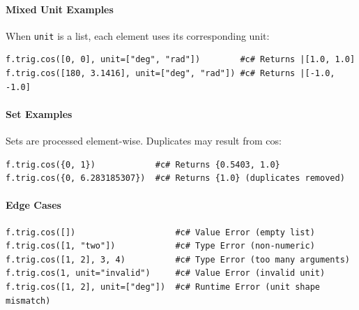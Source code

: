 \paragraph{Mixed Unit Examples}
When \texttt{unit} is a list, each element uses its corresponding unit:
\begin{verbatim}
f.trig.cos([0, 0], unit=["deg", "rad"])        #c# Returns |[1.0, 1.0]
f.trig.cos([180, 3.1416], unit=["deg", "rad"]) #c# Returns |[-1.0, -1.0]
\end{verbatim}

\paragraph{Set Examples}
Sets are processed element-wise. Duplicates may result from cos:
\begin{verbatim}
f.trig.cos({0, 1})            #c# Returns {0.5403, 1.0}
f.trig.cos({0, 6.283185307})  #c# Returns {1.0} (duplicates removed)
\end{verbatim}

\paragraph{Edge Cases}
\begin{verbatim}
f.trig.cos([])                    #c# Value Error (empty list)
f.trig.cos([1, "two"])            #c# Type Error (non-numeric)
f.trig.cos([1, 2], 3, 4)          #c# Type Error (too many arguments)
f.trig.cos(1, unit="invalid")     #c# Value Error (invalid unit)
f.trig.cos([1, 2], unit=["deg"])  #c# Runtime Error (unit shape mismatch)
\end{verbatim}

